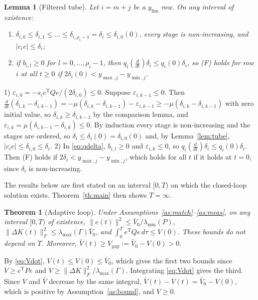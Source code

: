 \documentclass[lettersize,journal]{IEEEtran}
\newtheorem{lemma}{Lemma}
\newtheorem{theorem}{Theorem}
\newcommand{\ylim}{y_{\mathrm{lim}}}
\newcommand{\Vb}{\bar{V}}
\newcommand{\Vg}{V_{\mathrm{gap}}}
\newcommand{\T}{\mathrm{T}}
\begin{document}
\begin{lemma}[Filtered tube] \label{lem:ftube}
Let $i=m+j$ be a $\ylim$ row. On any interval of existence:
\begin{enumerate}
\item $\delta_{i,0}\le\delta_{i,1}\le\dots\le\delta_{i,\rho_i-1}=\delta_i\le\delta_{i,0}(0)$, every stage is non-increasing, and $|c_ie|\le\delta_i$;
\item if $b_{i,l}\ge0$ for $l=0,\dots,\rho_i-1$, then $q_i(\frac{d}{dt})\delta_i\le q_i(0)\delta_i$, so (F) holds for row $i$ at all $t\ge0$ if $2\delta_i(0)<y_{\max,j}-y_{\min,j}$.
\end{enumerate}
\end{lemma}
\begin{IEEEproof}
1) $\varepsilon_{i,0}=-s_ie^\T Qe/(2\delta_{i,0})\le0$. Suppose $\varepsilon_{i,k-1}\le0$. Then $\frac{d}{dt}(\delta_{i,k}-\delta_{i,k-1})=-\mu(\delta_{i,k}-\delta_{i,k-1})-\varepsilon_{i,k-1}\ge-\mu(\delta_{i,k}-\delta_{i,k-1})$ with zero initial value, so $\delta_{i,k}\ge\delta_{i,k-1}$ by the comparison lemma, and $\varepsilon_{i,k}=\mu(\delta_{i,k-1}-\delta_{i,k})\le0$. By induction every stage is non-increasing and the stages are ordered, so $\delta_i\le\delta_i(0)=\delta_{i,0}(0)$ and, by Lemma~\ref{lem:tube}, $|c_ie|\le\delta_{i,0}\le\delta_i$. 2) In \eqref{eq:qdelta}, $b_{i,l}\ge0$ and $\varepsilon_{i,k}\le0$, so $q_i(\frac{d}{dt})\delta_i\le q_i(0)\delta_i$. Then (F) holds if $2\delta_i<y_{\max,j}-y_{\min,j}$, which holds for all $t$ if it holds at $t=0$, since $\delta_i$ is non-increasing.
\end{IEEEproof}

The results below are first stated on an interval $[0,T)$ on which the closed-loop solution exists. Theorem~\ref{th:main} then shows $T=\infty$.

\begin{theorem}[Adaptive loop] \label{th:stab}
Under Assumptions~\ref{as:match}--\ref{as:meas}, on any interval $[0,T)$ of existence, $\|e(t)\|^2\le\Vb_0/\lambda_{\min}(P)$, $\|\Delta K(t)\|_F^2\le\lambda_{\max}(\Gamma)\Vb_0$, and $\int_0^T e^\T Q e\,d\tau\le V(0)$. These bounds do not depend on $T$. Moreover, $\Vb(t)\ge\Vg:=\Vb_0-V(0)>0$.
\end{theorem}
\begin{IEEEproof}
By \eqref{eq:Vdot}, $V(t)\le V(0)\le\Vb_0$, which gives the first two bounds since $V\ge e^\T Pe$ and $V\ge\|\Delta K\|_F^2/\lambda_{\max}(\Gamma)$. Integrating \eqref{eq:Vdot} gives the third. Since $V$ and $\Vb$ decrease by the same integral, $\Vb(t)-V(t)=\Vb_0-V(0)$, which is positive by Assumption~\ref{as:bound}, and $V\ge0$.
\end{IEEEproof}
\end{document}
